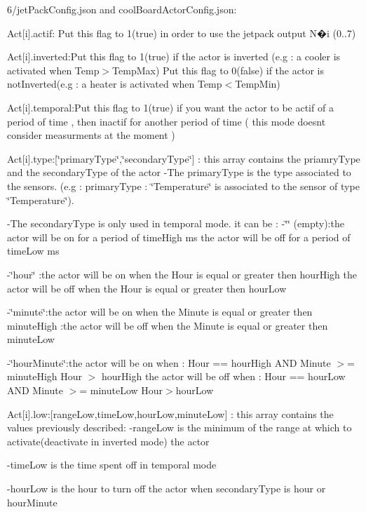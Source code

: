 6/jet\+Pack\+Config.\+json and cool\+Board\+Actor\+Config.\+json\+:

Act\mbox{[}i\mbox{]}.actif\+: Put this flag to 1(true) in order to use the jetpack output N�i (0..7)

Act\mbox{[}i\mbox{]}.inverted\+:Put this flag to 1(true) if the actor is inverted (e.\+g \+: a cooler is activated when Temp$>$Temp\+Max) Put this flag to 0(false) if the actor is not\+Inverted(e.\+g \+: a heater is activated when Temp$<$Temp\+Min)

Act\mbox{[}i\mbox{]}.temporal\+:Put this flag to 1(true) if you want the actor to be actif of a period of time , then inactif for another period of time ( this mode doesn\textquotesingle{}t consider measurments at the moment )

Act\mbox{[}i\mbox{]}.type\+:\mbox{[}\char`\"{}primary\+Type\char`\"{},\char`\"{}secondary\+Type\char`\"{}\mbox{]} \+: this array contains the priamry\+Type and the secondary\+Type of the actor -\/\+The primary\+Type is the type associated to the sensors. (e.\+g \+: primary\+Type \+: \char`\"{}\+Temperature\char`\"{} is associated to the sensor of type \char`\"{}\+Temperature\char`\"{}).

-\/\+The secondary\+Type is only used in temporal mode. it can be \+: -\/\char`\"{}\char`\"{} (empty)\+:the actor will be on for a period of time\+High ms the actor will be off for a period of time\+Low ms

-\/\char`\"{}hour\char`\"{} \+:the actor will be on when the Hour is equal or greater then hour\+High the actor will be off when the Hour is equal or greater then hour\+Low

-\/\char`\"{}minute\char`\"{}\+:the actor will be on when the Minute is equal or greater then minute\+High \+:the actor will be off when the Minute is equal or greater then minute\+Low

-\/\char`\"{}hour\+Minute\char`\"{}\+:the actor will be on when \+: Hour == hour\+High A\+ND Minute $>$= minute\+High Hour $>$ hour\+High the actor will be off when \+: Hour == hour\+Low A\+ND Minute $>$= minute\+Low Hour$>$hour\+Low

Act\mbox{[}i\mbox{]}.low\+:\mbox{[}range\+Low,time\+Low,hour\+Low,minute\+Low\mbox{]} \+: this array contains the values previously described\+: -\/range\+Low is the minimum of the range at which to activate(deactivate in inverted mode) the actor

-\/time\+Low is the time spent off in temporal mode

-\/hour\+Low is the hour to turn off the actor when secondary\+Type is hour or hour\+Minute

